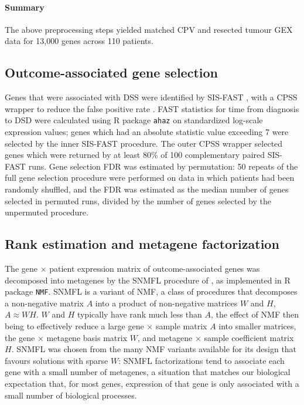 \documentclass[dissertation.tex]{subfiles}
\begin{document}
\paragraph{Summary}
The above preprocessing steps yielded matched \gls{CPV} and resected tumour \gls{GEX} data for 13,000 genes across 110 patients.

\subsection{Outcome-associated gene selection}
Genes that were associated with \gls{DSS} were identified by \gls{SIS}-\gls{FAST} \cite{Gorst-Rasmussen2013}, with a \gls{CPSS} wrapper to reduce the false positive rate \cite{Shah2013}.  \gls{FAST} statistics for time from diagnosis to \gls{DSD} were calculated using R package \texttt{ahaz} on standardized log-scale expression values; genes which had an absolute statistic value exceeding 7 were selected by the inner \gls{SIS}-\gls{FAST} procedure.  The outer \gls{CPSS} wrapper selected genes which were returned by at least 80\% of 100 complementary paired \gls{SIS}-\gls{FAST} runs.  Gene selection \gls{FDR} was estimated by permutation: 50 repeats of the full gene selection procedure were performed on data in which patients had been randomly shuffled, and the \gls{FDR} was estimated as the median number of genes selected in permuted runs, divided by the number of genes selected by the unpermuted procedure.

\subsection{Rank estimation and metagene factorization}
\label{subsec:sigs-nmf}
The gene $\times$ patient expression matrix of outcome-associated genes was decomposed into metagenes by the \gls{SNMFL} procedure of \cite{Kim2007}, as implemented in R package \texttt{NMF}.  \gls{SNMFL} is a variant of \gls{NMF}, a class of procedures that decomposes a non-negative matrix $A$ into a product of non-negative matrices $W$ and $H$, $A \approx WH$.  $W$ and $H$ typically have rank much less than $A$, the effect of \gls{NMF} then being to effectively reduce a large gene $\times$ sample matrix $A$ into smaller matrices, the gene $\times$ metagene basis matrix $W$, and metagene $\times$ sample coefficient matrix $H$.  \gls{SNMFL} was chosen from the many \gls{NMF} variants available for its design that favours solutions with sparse $W$: \gls{SNMFL} factorizations tend to associate each gene with a small number of metagenes, a situation that matches our biological expectation that, for most genes, expression of that gene is only associated with a small number of biological processes.
\end{document}
